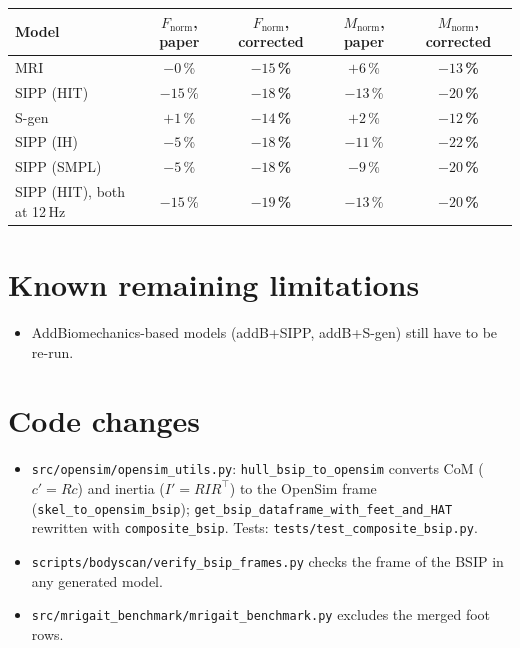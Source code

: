 \documentclass[10pt,a4paper]{article}
\newcommand{\new}[1]{\textbf{#1}}
\begin{document}
\begin{center}
\small
\begin{tabular}{lcccc}
\toprule
Model & $F_{\mathrm{norm}}$, paper & $F_{\mathrm{norm}}$, \new{corrected} & $M_{\mathrm{norm}}$, paper & $M_{\mathrm{norm}}$, \new{corrected} \\
\midrule
MRI                        & $-0$\,\%  & \new{$-15$\,\%} & $+6$\,\%  & \new{$-13$\,\%} \\
SIPP (HIT)                 & $-15$\,\% & \new{$-18$\,\%} & $-13$\,\% & \new{$-20$\,\%} \\
S-gen                      & $+1$\,\%  & \new{$-14$\,\%} & $+2$\,\%  & \new{$-12$\,\%} \\
SIPP (IH)                  & $-5$\,\%  & \new{$-18$\,\%} & $-11$\,\% & \new{$-22$\,\%} \\
SIPP (SMPL)                & $-5$\,\%  & \new{$-18$\,\%} & $-9$\,\%  & \new{$-20$\,\%} \\
SIPP (HIT), both at 12\,Hz & $-15$\,\% & \new{$-19$\,\%} & $-13$\,\% & \new{$-20$\,\%} \\
\bottomrule
\end{tabular}
\end{center}

\section*{Known remaining limitations}
\begin{itemize}
  \item AddBiomechanics-based models (addB+SIPP, addB+S-gen) still have to be re-run.
\end{itemize}

\section*{Code changes}
\begin{itemize}
  \item \texttt{src/opensim/opensim\_utils.py}: \texttt{hull\_bsip\_to\_opensim} converts CoM ($c' = Rc$) and inertia ($I' = RIR^{\top}$) to the OpenSim frame (\texttt{skel\_to\_opensim\_bsip}); \texttt{get\_bsip\_dataframe\_with\_feet\_and\_HAT} rewritten with \texttt{composite\_bsip}. Tests: \texttt{tests/test\_composite\_bsip.py}.
  \item \texttt{scripts/bodyscan/verify\_bsip\_frames.py} checks the frame of the BSIP in any generated model.
  \item \texttt{src/mrigait\_benchmark/mrigait\_benchmark.py} excludes the merged foot rows.
\end{itemize}
\end{document}
